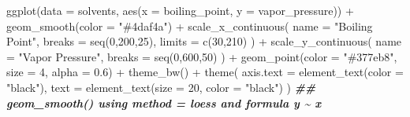 \documentclass[
]{krantz}
\newenvironment{Shaded}{\begin{snugshade}}{\end{snugshade}}
\newcommand{\AttributeTok}[1]{\textcolor[rgb]{0.77,0.63,0.00}{#1}}
\newcommand{\DecValTok}[1]{\textcolor[rgb]{0.00,0.00,0.81}{#1}}
\newcommand{\DocumentationTok}[1]{\textcolor[rgb]{0.56,0.35,0.01}{\textbf{\textit{#1}}}}
\newcommand{\FloatTok}[1]{\textcolor[rgb]{0.00,0.00,0.81}{#1}}
\newcommand{\FunctionTok}[1]{\textcolor[rgb]{0.00,0.00,0.00}{#1}}
\newcommand{\NormalTok}[1]{#1}
\newcommand{\SpecialCharTok}[1]{\textcolor[rgb]{0.00,0.00,0.00}{#1}}
\newcommand{\StringTok}[1]{\textcolor[rgb]{0.31,0.60,0.02}{#1}}
\begin{document}
\begin{Shaded}
\begin{Highlighting}[]
\FunctionTok{ggplot}\NormalTok{(}\AttributeTok{data =}\NormalTok{ solvents, }\FunctionTok{aes}\NormalTok{(}\AttributeTok{x =}\NormalTok{ boiling\_point, }\AttributeTok{y =}\NormalTok{ vapor\_pressure)) }\SpecialCharTok{+} 
  \FunctionTok{geom\_smooth}\NormalTok{(}\AttributeTok{color =} \StringTok{"\#4daf4a"}\NormalTok{) }\SpecialCharTok{+}
  \FunctionTok{scale\_x\_continuous}\NormalTok{(}
    \AttributeTok{name =} \StringTok{"Boiling Point"}\NormalTok{, }\AttributeTok{breaks =} \FunctionTok{seq}\NormalTok{(}\DecValTok{0}\NormalTok{,}\DecValTok{200}\NormalTok{,}\DecValTok{25}\NormalTok{), }\AttributeTok{limits =} \FunctionTok{c}\NormalTok{(}\DecValTok{30}\NormalTok{,}\DecValTok{210}\NormalTok{)}
\NormalTok{  ) }\SpecialCharTok{+}
  \FunctionTok{scale\_y\_continuous}\NormalTok{(}
    \AttributeTok{name =} \StringTok{"Vapor Pressure"}\NormalTok{, }\AttributeTok{breaks =} \FunctionTok{seq}\NormalTok{(}\DecValTok{0}\NormalTok{,}\DecValTok{600}\NormalTok{,}\DecValTok{50}\NormalTok{)}
\NormalTok{  ) }\SpecialCharTok{+}
  \FunctionTok{geom\_point}\NormalTok{(}\AttributeTok{color =} \StringTok{"\#377eb8"}\NormalTok{, }\AttributeTok{size =} \DecValTok{4}\NormalTok{, }\AttributeTok{alpha =} \FloatTok{0.6}\NormalTok{) }\SpecialCharTok{+}
  \FunctionTok{theme\_bw}\NormalTok{() }\SpecialCharTok{+}
  \FunctionTok{theme}\NormalTok{(}
    \AttributeTok{axis.text =} \FunctionTok{element\_text}\NormalTok{(}\AttributeTok{color =} \StringTok{"black"}\NormalTok{),}
    \AttributeTok{text =} \FunctionTok{element\_text}\NormalTok{(}\AttributeTok{size =} \DecValTok{20}\NormalTok{, }\AttributeTok{color =} \StringTok{"black"}\NormalTok{)}
\NormalTok{  )}
\DocumentationTok{\#\# \textasciigrave{}geom\_smooth()\textasciigrave{} using method = \textquotesingle{}loess\textquotesingle{} and formula \textquotesingle{}y \textasciitilde{} x\textquotesingle{}}
\end{Highlighting}
\end{Shaded}
\end{document}
